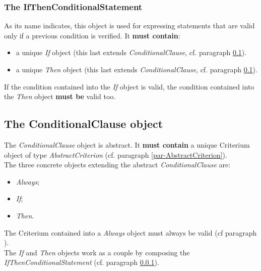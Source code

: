 \documentclass[a4paper,11pt] {article}
\begin{document}
\subsubsection{The IfThenConditionalStatement}\label{par-IfThenConditionalStatement}
As its name indicates, this object is used for expressing statements that are valid only if a previous condition is verified. It {\bf must contain}:
\begin{itemize}
\item a unique {\it If} object (this last extends {\it ConditionalClause}, cf. paragraph \ref{par-ConditionalClause}).
\item a unique {\it Then} object (this last extends {\it ConditionalClause}, cf. paragraph \ref{par-ConditionalClause}).
\end{itemize}
If the condition contained into the {\it If} object is valid, the condition contained into the {\it Then} object {\bf must be} valid too.

\subsection{The ConditionalClause object}\label{par-ConditionalClause}
The {\it ConditionalClause} object is abstract. It {\bf must contain} a unique Criterium object of type {\it AbstractCriterion} (cf. paragraph \ref{par-AbstractCriterion}).\\
The three concrete objects extending the abstract {\it ConditionalClause} are:
\begin{itemize}
\item {\it Always};
\item {\it If};
\item {\it Then}.
\end{itemize}
The Criterium contained into a {\it Always} object must always be valid (cf paragraph \label{par-AlwaysConditionalStatement}).\\
The {\it If} and {\it Then} objects work as a couple by composing the  {\it IfThenConditionalStatement} (cf. paragraph 
\ref{par-IfThenConditionalStatement}).
\end{document}
